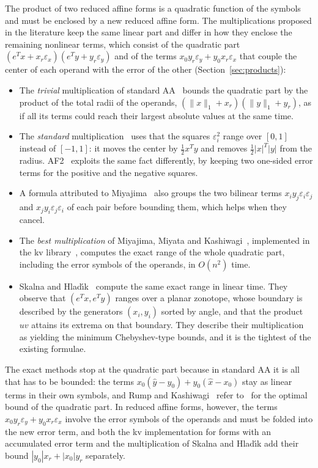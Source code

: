 \documentclass[10pt]{article}
\theoremstyle{definition}
\newcommand{\eps}{\varepsilon}
\newcommand{\ex}{\eps_x}
\newcommand{\ey}{\eps_y}
\begin{document}
The product of two reduced affine forms is a quadratic function of the symbols and must be enclosed by a new reduced affine form. The multiplications proposed in the literature keep the same linear part and differ in how they enclose the remaining nonlinear terms, which consist of the quadratic part $(e^Tx+x_r\ex)(e^Ty+y_r\ey)$ and of the terms $x_0y_r\ey+y_0x_r\ex$ that couple the center of each operand with the error of the other (Section~\ref{sec:products}):
\begin{itemize}
\item The \emph{trivial} multiplication of standard AA~\cite{stolfi1997self} bounds the quadratic part by the product of the total radii of the operands, $(\|x\|_1+x_r)(\|y\|_1+y_r)$, as if all its terms could reach their largest absolute values at the same time.
\item The \emph{standard} multiplication~\cite{kolev2004improved,vu2009enhancing} uses that the squares $\eps_i^2$ range over $[0,1]$ instead of $[-1,1]$: it moves the center by $\tfrac12x^Ty$ and removes $\tfrac12|x|^T|y|$ from the radius. AF2~\cite{messine2002extentions} exploits the same fact differently, by keeping two one-sided error terms for the positive and the negative squares.
\item A formula attributed to Miyajima~\cite{skalna2017new} also groups the two bilinear terms $x_iy_j\eps_i\eps_j$ and $x_jy_i\eps_j\eps_i$ of each pair before bounding them, which helps when they cancel.
\item The \emph{best multiplication} of Miyajima, Miyata and Kashiwagi~\cite{miyajima2003best}, implemented in the kv library~\cite{kvlib}, computes the exact range of the whole quadratic part, including the error symbols of the operands, in $O(n^2)$ time.
\item Skalna and Hlad\'{\i}k~\cite{skalna2017new} compute the same exact range in linear time. They observe that $(e^Tx,e^Ty)$ ranges over a planar zonotope, whose boundary is described by the generators $(x_i,y_i)$ sorted by angle, and that the product $uv$ attains its extrema on that boundary. They describe their multiplication as yielding the minimum Chebyshev-type bounds, and it is the tightest of the existing formulae.
\end{itemize}
The exact methods stop at the quadratic part because in standard AA it is all that has to be bounded: the terms $x_0(\hat y-y_0)+y_0(\hat x-x_0)$ stay as linear terms in their own symbols, and Rump and Kashiwagi~\cite{rump2015implementation} refer to~\cite{miyajima2003best} for the optimal bound of the quadratic part. In reduced affine forms, however, the terms $x_0y_r\ey+y_0x_r\ex$ involve the error symbols of the operands and must be folded into the new error term, and both the kv implementation for forms with an accumulated error term and the multiplication of Skalna and Hlad\'{\i}k add their bound $|y_0|x_r+|x_0|y_r$ separately.
\end{document}

